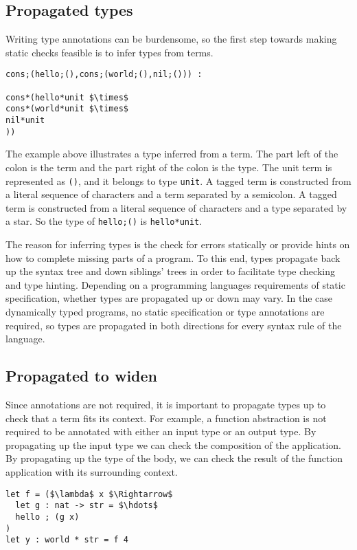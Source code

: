 \documentclass[sigplan]{acmart}
\theoremstyle{definition}
\begin{document}
\subsection{Propagated types}
Writing type annotations can be burdensome, so the first step 
towards making static checks feasible is to infer types from terms.

\begin{lstlisting}
cons;(hello;(),cons;(world;(),nil;())) : 

cons*(hello*unit $\times$ 
cons*(world*unit $\times$ 
nil*unit
))
\end{lstlisting}

\noindent The example above illustrates a type inferred from a term.
The part left of the colon is the term and the part right of the colon is the type.
The unit term is represented as \lstinline{()}, and it belongs to type \lstinline{unit}. 
A tagged term is constructed from a literal sequence of characters and a term separated
by a semicolon. A tagged term is constructed from a literal sequence of characters
and a type separated by a star.
So the type of \lstinline{hello;()} is \lstinline{hello*unit}.

The reason for inferring types is the check for errors statically or 
provide hints on how to complete missing parts of a program. To this end,
types propagate back up the syntax tree and down siblings' trees in order
to facilitate type checking and type hinting.
Depending on a programming languages requirements of static specification, 
whether types are propagated up or down may vary. 
In the case dynamically typed programs, no static specification or type annotations
are required, so types are propagated in both directions for every syntax rule
of the language.


\subsection{Propagated to widen}
Since annotations are not required, it is important to propagate types up to check
that a term fits its context.
For example, a function abstraction is not required to be annotated 
with either an input type or an output type. 
\noindent By propagating up the input type we can check the composition of the application.
By propagating up the type of the body, we can check the result of the function application 
with its surrounding context. 

\begin{lstlisting}
let f = ($\lambda$ x $\Rightarrow$ 
  let g : nat -> str = $\hdots$
  hello ; (g x)
) 
let y : world * str = f 4
\end{lstlisting}
\end{document}
